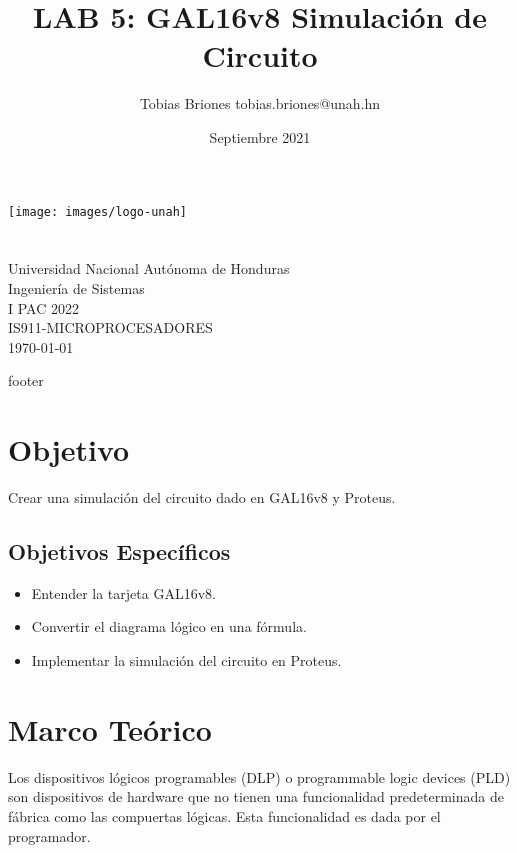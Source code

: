 \documentclass{article}
\title{LAB 5: GAL16v8 Simulación de Circuito}
\author{Tobias Briones \bigbreak tobias.briones@unah.hn}
\date{Septiembre 2021}
\begin{document}
    \makeatletter
    \begin{titlepage}
        \begin{center}
            \texttt{[image: images/logo-unah]}\\[4ex]
            {\huge \bfseries \@title
            \vspace{1cm}}\\[2ex]
            {\LARGE \@author}\\[50ex]

            {\large
            Universidad Nacional Autónoma de Honduras\\
            Ingeniería de Sistemas\\
            I PAC 2022\\
            IS911-MICROPROCESADORES
            }\\[2ex]

            {\large \today}
        \end{center}
    \end{titlepage}
    \makeatother
    \thispagestyle{empty}
    \newpage

    {footer}

    \section{Objetivo}\label{sec:objetivo}

    Crear una simulación del circuito dado en GAL16v8 y Proteus.

    \subsection{Objetivos Específicos}\label{subsec:objetivos-específicos}

    \begin{itemize}
        \item Entender la tarjeta GAL16v8.
        \item Convertir el diagrama lógico en una fórmula.
        \item Implementar la simulación del circuito en Proteus.
    \end{itemize}

    \section{Marco Teórico}\label{sec:marco-teórico}

    Los dispositivos lógicos programables (DLP) o programmable logic devices
    (PLD) son dispositivos de hardware que no tienen una funcionalidad
    predeterminada de fábrica como las compuertas lógicas. Esta funcionalidad
    es dada por el programador.
\end{document}
